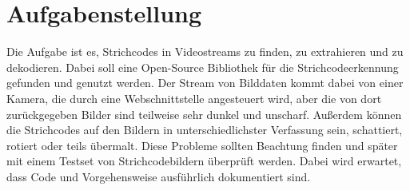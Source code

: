 \section{Aufgabenstellung}
Die Aufgabe ist es, Strichcodes in Videostreams zu finden, zu extrahieren und zu dekodieren. Dabei soll eine Open-Source Bibliothek für die Strichcodeerkennung gefunden und genutzt werden.
Der Stream von Bilddaten kommt dabei von einer Kamera, die durch eine Webschnittstelle angesteuert wird, aber die von dort zurückgegeben Bilder sind teilweise sehr dunkel und unscharf. Außerdem können die Strichcodes auf den Bildern in unterschiedlichster Verfassung sein, schattiert, rotiert oder teils übermalt.
Diese Probleme sollten Beachtung finden und später mit einem Testset von Strichcodebildern %
überprüft werden.
Dabei wird erwartet, dass Code und Vorgehensweise ausführlich dokumentiert sind.